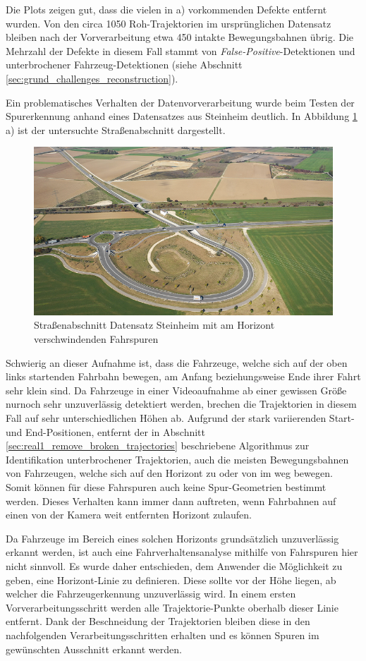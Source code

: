 Die Plots zeigen gut, dass die vielen in a) vorkommenden Defekte entfernt wurden. Von den
circa 1050 Roh-Trajektorien im ursprünglichen Datensatz bleiben nach der Vorverarbeitung etwa 450 intakte
Bewegungsbahnen übrig. Die Mehrzahl der Defekte in diesem Fall stammt von \textit{False-Positive}-Detektionen
und unterbrochener Fahrzeug-Detektionen (siehe Abschnitt \ref{sec:grund_challenges_reconstruction}).

Ein problematisches Verhalten der Datenvorverarbeitung wurde beim Testen der Spurerkennung anhand eines
Datensatzes aus Steinheim deutlich. In Abbildung \ref{fig:results_horizon_problem} a) ist der
untersuchte Straßenabschnitt dargestellt.

\begin{figure}[H]
    \centering
    \includegraphics[width=0.5\linewidth]{resources/img/results/Steinheim/steinheim}
    \caption[Straßenabschnitt Datensatz Steinheim]
            {Straßenabschnitt Datensatz Steinheim mit am Horizont verschwindenden Fahrspuren}
    \label{fig:results_horizon_problem}
\end{figure}

Schwierig an dieser Aufnahme ist, dass die Fahrzeuge, welche sich auf der oben links startenden Fahrbahn bewegen,
am Anfang beziehungsweise Ende ihrer Fahrt sehr klein sind. Da Fahrzeuge in einer Videoaufnahme ab einer gewissen Größe
nurnoch sehr unzuverlässig detektiert werden, brechen die Trajektorien in diesem Fall auf sehr
unterschiedlichen Höhen ab.
Aufgrund der stark variierenden Start- und End-Positionen, entfernt der in Abschnitt
\ref{sec:real1_remove_broken_trajectories} beschriebene Algorithmus zur Identifikation unterbrochener
Trajektorien, auch die meisten Bewegungsbahnen von Fahrzeugen, welche sich auf den Horizont zu oder von im weg bewegen.
Somit können für diese Fahrspuren auch keine Spur-Geometrien bestimmt werden.
Dieses Verhalten kann immer dann auftreten, wenn Fahrbahnen auf einen von der Kamera weit entfernten Horizont zulaufen.

Da Fahrzeuge im Bereich eines solchen Horizonts grundsätzlich unzuverlässig erkannt werden, ist auch eine Fahrverhaltensanalyse
mithilfe von Fahrspuren hier nicht sinnvoll. Es wurde daher entschieden, dem Anwender die Möglichkeit zu geben, eine
Horizont-Linie zu definieren. Diese sollte vor der Höhe liegen, ab welcher die Fahrzeugerkennung unzuverlässig wird.
In einem ersten Vorverarbeitungsschritt werden alle Trajektorie-Punkte oberhalb dieser
Linie entfernt. Dank der Beschneidung der Trajektorien bleiben diese in den nachfolgenden Verarbeitungsschritten
erhalten und es können Spuren im gewünschten Ausschnitt erkannt werden.

